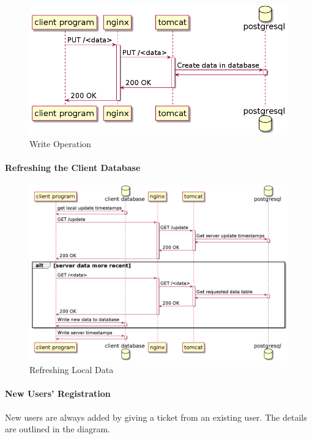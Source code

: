 \documentclass{memoir}
\begin{document}
\begin{figure}[!ht]
\includegraphics[width=\linewidth]{diagrams/put-data.png}
\caption{Write Operation}
\end{figure}

\paragraph{Refreshing the Client Database\\}

\begin{figure}[!ht]
\includegraphics[width=\linewidth]{diagrams/refresh-data.png}
\caption{Refreshing Local Data}
\end{figure}

\paragraph{New Users' Registration}

New users are always added by giving a ticket from an existing user. The details
are outlined in the diagram.
\end{document}
